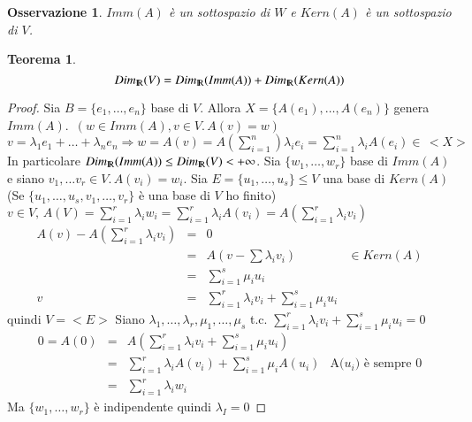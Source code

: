 \documentclass[12pt,a4paper]{article}
\theoremstyle{break}
\newtheorem{theorem}{Teorema}[section]
\newtheorem{observation}{Osservazione}[subsection]
\newcommand\R{{\rm I\!R}}
\newcommand{\Dim}[1]{Dim_{\R}(#1)}
\begin{document}
    \begin{observation}
        $Imm(A)$ è un sottospazio di $W$ e $Kern(A)$ è un sottospazio di $V$.
    \end{observation}
    \begin{theorem}
        \[\Dim{V} = \Dim{Imm(A)} + \Dim{Kern(A)}\]
    \end{theorem}
    \begin{proof}
        Sia $B = \{e_1,\dots ,e_n\}$ base di $V$. Allora $X = \{A(e_1),\dots , A(e_n)\}$ genera $Imm(A).$\newline
        $\, (w\in Imm(A), v\in V.\, A(v) = w)$\newline
        $v = \lambda_1e_1 + \dots + \lambda_ne_n \Rightarrow w = A(v) = A(\sum_{i=1}^n) \lambda_ie_i = \sum_{i=1}^n\lambda_iA(e_i) \in\, <X>$\newline
        In particolare $\Dim{Imm(A)}\leq \Dim{V}<+\infty$.\newline
        Sia $\{w_1,\dots ,w_r\}$ base di $Imm(A)$ e siano $v_1, \dots v_r \in V.\, A(v_i) = w_i$.\newline
        Sia $E = \{u_1,\dots ,u_s\}\leq V$ una base di $Kern(A)$ (Se $\{u_1,\dots , u_s, v_1,\dots ,v_r\}$ è una base di $V$ ho finito)\newline
        $v\in V,\, A(V) = \sum_{i=1}^r \lambda_iw_i = \sum_{i=1}^r\lambda_iA(v_i) = A(\sum_{i=1}^r \lambda_iv_i)$
        \[
            \begin{matrix}
                A(v) - A(\sum_{i=1}^r\lambda_iv_i) & = & 0 \\
                & = & A(v - \sum\lambda_iv_i) & \in Kern(A)\\
                & = & \sum_{i=1}^s \mu_iu_i \\
                v & = & \sum_{i=1}^r \lambda_iv_i + \sum_{i=1}^s \mu_iu_i
            \end{matrix}
        \]
        quindi $V = <E>$\newline
        Siano $\lambda_1,\dots ,\lambda_r, \mu_1,\dots , \mu_s$ t.c. $\sum_{i=1}^r\lambda_iv_i + \sum_{i=1}^s\mu_iu_i = 0$
        \[
            \begin{matrix}
                0=A(0) & = & A(\sum_{i=1}^r\lambda_iv_i + \sum_{i=1}^s\mu_iu_i) \\
                & = & \sum_{i=1}^r\lambda_iA(v_i) + \sum_{i=1}^s\mu_iA(u_i) & \text{A($u_i$) è sempre 0} \\
                & = & \sum_{i=1}^r \lambda_iw_i
            \end{matrix}
        \]
        Ma $\{w_1,\dots ,w_r\}$ è indipendente quindi $\lambda_I = 0$
    \end{proof}
\end{document}
